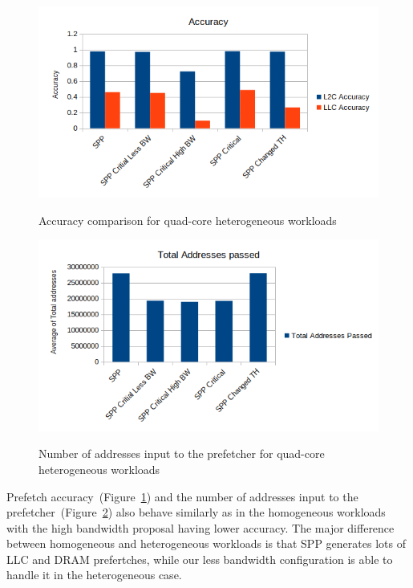 \begin{figure}[H]
{\includegraphics[scale=0.7]{images/Accuracy_hetro.png}}
\caption{Accuracy comparison for quad-core heterogeneous workloads}
\label{fig:hetero-accuracy}
\end{figure}
\begin{figure}[H]
{\includegraphics[scale=0.7]{images/Total Addresses_hetro.png}}
\caption{Number of addresses input to the prefetcher for quad-core heterogeneous workloads}
\label{fig:hetero-addr}
\end{figure}

Prefetch accuracy~(Figure~\ref{fig:hetero-accuracy}) and the number of addresses input to the prefetcher~(Figure~\ref{fig:hetero-addr}) also behave similarly as in the homogeneous workloads with the high bandwidth proposal having lower accuracy.
The major difference between homogeneous and heterogeneous workloads is that SPP generates lots of LLC and DRAM prefertches, while our less bandwidth configuration is able to handle it in the heterogeneous case.